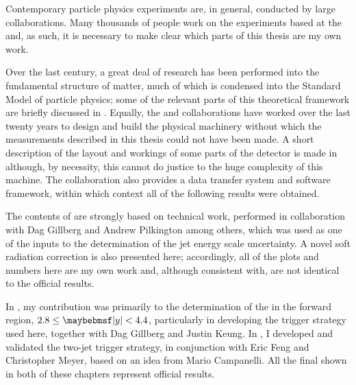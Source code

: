 \DeclareRobustCommand{\personDG}{Dag Gillberg\xspace}
\DeclareRobustCommand{\personAP}{Andrew Pilkington\xspace}
\DeclareRobustCommand{\personJK}{Justin Keung\xspace}
\DeclareRobustCommand{\personEF}{Eric Feng\xspace}
\DeclareRobustCommand{\personCM}{Christopher Meyer\xspace}
\DeclareRobustCommand{\personMC}{Mario Campanelli\xspace}
\DeclareRobustCommand{\personPB}{Pauline Bernat\xspace}
\DeclareRobustCommand{\personGB}{Gareth Brown\xspace}
\DeclareRobustCommand{\personAD}{Adam Davison\xspace}
\DeclareRobustCommand{\personJM}{James Monk\xspace}

Contemporary particle physics experiments are, in general, conducted by large
collaborations. Many thousands of people work on the experiments based at the
\LHC and, as such, it is necessary to make clear which parts of this thesis are
my own work.

Over the last century, a great deal of research has been performed into the
fundamental structure of matter, much of which is condensed into the Standard
Model of particle physics; some of the relevant parts of this theoretical
framework are briefly discussed in . Equally, the
\ATLAS and \LHC collaborations have worked over the last twenty years to design
and build the physical machinery without which the measurements described in
this thesis could not have been made. A short description of the layout and
workings of some parts of the \ATLAS detector is made in
 although, by necessity, this cannot do justice to the
huge complexity of this machine. The \ATLAS collaboration also provides a data
transfer system and software framework, within which context all of the
following results were obtained.

The contents of  are strongly based on
technical work, performed in collaboration with \personDG and \personAP among
others, which was used as one of the inputs to the determination of the \ATLAS
jet energy scale uncertainty. A novel soft radiation correction is also
presented here; accordingly, all of the plots and numbers here are my own work
and, although consistent with, are not identical to the official results.

In , my contribution was primarily to the
determination of the \xs in the forward region, $2.8 \leq \absRap < 4.4$,
particularly in developing the trigger strategy used here, together with
\personDG and \personJK. In , I developed and validated
the two-jet trigger strategy, in conjunction with \personEF and \personCM, based
on an idea from \personMC. All the final  shown in both of these chapters
represent official \ATLAS results.

